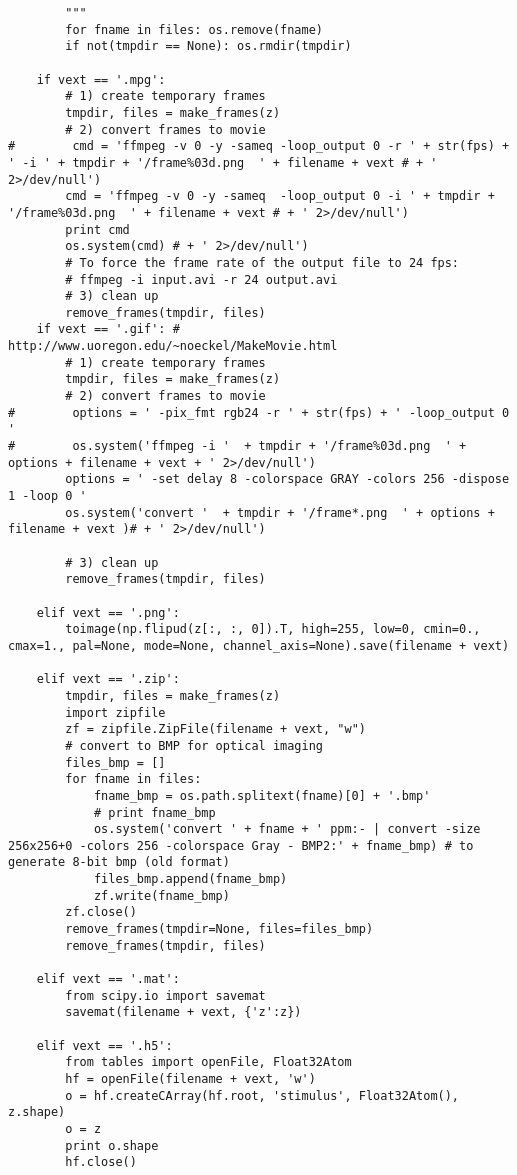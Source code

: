 \documentclass[a4paper,11pt]{article}%
\begin{document}
\begin{lstlisting}
        """
        for fname in files: os.remove(fname)
        if not(tmpdir == None): os.rmdir(tmpdir)

    if vext == '.mpg':
        # 1) create temporary frames
        tmpdir, files = make_frames(z)
        # 2) convert frames to movie
#        cmd = 'ffmpeg -v 0 -y -sameq -loop_output 0 -r ' + str(fps) + ' -i ' + tmpdir + '/frame%03d.png  ' + filename + vext # + ' 2>/dev/null')
        cmd = 'ffmpeg -v 0 -y -sameq  -loop_output 0 -i ' + tmpdir + '/frame%03d.png  ' + filename + vext # + ' 2>/dev/null')
        print cmd
        os.system(cmd) # + ' 2>/dev/null')
        # To force the frame rate of the output file to 24 fps:
        # ffmpeg -i input.avi -r 24 output.avi
        # 3) clean up
        remove_frames(tmpdir, files)
    if vext == '.gif': # http://www.uoregon.edu/~noeckel/MakeMovie.html
        # 1) create temporary frames
        tmpdir, files = make_frames(z)
        # 2) convert frames to movie
#        options = ' -pix_fmt rgb24 -r ' + str(fps) + ' -loop_output 0 '
#        os.system('ffmpeg -i '  + tmpdir + '/frame%03d.png  ' + options + filename + vext + ' 2>/dev/null')
        options = ' -set delay 8 -colorspace GRAY -colors 256 -dispose 1 -loop 0 '
        os.system('convert '  + tmpdir + '/frame*.png  ' + options + filename + vext )# + ' 2>/dev/null')

        # 3) clean up
        remove_frames(tmpdir, files)

    elif vext == '.png':
        toimage(np.flipud(z[:, :, 0]).T, high=255, low=0, cmin=0., cmax=1., pal=None, mode=None, channel_axis=None).save(filename + vext)

    elif vext == '.zip':
        tmpdir, files = make_frames(z)
        import zipfile
        zf = zipfile.ZipFile(filename + vext, "w")
        # convert to BMP for optical imaging
        files_bmp = []
        for fname in files:
            fname_bmp = os.path.splitext(fname)[0] + '.bmp'
            # print fname_bmp
            os.system('convert ' + fname + ' ppm:- | convert -size 256x256+0 -colors 256 -colorspace Gray - BMP2:' + fname_bmp) # to generate 8-bit bmp (old format)
            files_bmp.append(fname_bmp)
            zf.write(fname_bmp)
        zf.close()
        remove_frames(tmpdir=None, files=files_bmp)
        remove_frames(tmpdir, files)

    elif vext == '.mat':
        from scipy.io import savemat
        savemat(filename + vext, {'z':z})

    elif vext == '.h5':
        from tables import openFile, Float32Atom
        hf = openFile(filename + vext, 'w')
        o = hf.createCArray(hf.root, 'stimulus', Float32Atom(), z.shape)
        o = z
        print o.shape
        hf.close()


\end{lstlisting}
\end{document}
